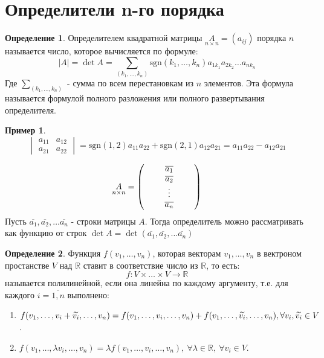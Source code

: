 \documentclass[a4paper, 12pt]{article}
\newcommand{\R}{\mathbb R}
\newcommand\tab[1][.5cm]{\hspace*{#1}}
\theoremstyle{definition}
\newtheorem*{definition}{Определение}
\newtheorem*{example1}{Пример}
\begin{document}
  \section{Определители n-го порядка}
  \begin{definition}
    Определителем квадратной матрицы $\underset{n \times n}{A}=(a_{ij})$ порядка $n$ называется число, которое вычисляется по формуле:
    $$|A|=\det{A}=\sum\limits_{(k_1,\dots,k_n)}\textrm{sgn}(k_1,\dots,k_n)a_{1k_1}a_{2k_2}\dots a_{nk_n}$$
    Где $\sum\limits_{(k_1,\dots,k_n)}$ - сумма по всем перестановкам из $n$ элементов. Эта формула называется формулой полного разложения или полного развертывания определителя.
  \end{definition}
  \begin{example1}
    $$\begin{vmatrix}
      a_{11} & a_{12}\\
      a_{21} & a_{22}  
    \end{vmatrix} = \textrm{sgn}(1,2)a_{11}a_{22}+\textrm{sgn}(2,1)a_{12}a_{21}=a_{11}a_{22}-a_{12}a_{21}$$
  \end{example1}
  $$\underset{n \times n}{A}=\begin{pmatrix}
    \tab & \overline{a_1} & \tab\\
    \null & \overline{a_2} & \null\\
    \null & \vdots & \null\\
    \null & \overline{a_n} & \null
  \end{pmatrix}$$
  Пусть $\overline{a_1}, \overline{a_2}, \dots \overline{a_n}$ - строки матрицы $A$. Тогда определитель можно рассматривать как функцию от строк $\det{A}=\det{(\overline{a_1},\overline{a_2},\dots \overline{a_n})}$
  \begin{definition}
    Функция $f(v_1,\dots, v_n)$, которая векторам $v_1,\dots, v_n$ в вектроном простанстве $V$ над $\R$ ставит в соответствие число из $\R$, то есть: $$f:V\times\dots\times V\to \R$$
    называется полилинейной, если она линейна по каждому аргументу, т.е. для каждого $i=\overline{1,n}$ выполнено:
    \begin{enumerate}
      \item $f(v_1,\dots, v_i+\widetilde{v_i},\dots, v_n)=f(v_1,\dots, v_i,\dots, v_n)+f(v_1,\dots, \widetilde{v_i},\dots, v_n),\\ \forall v_i, \widetilde{v_i}\in V$.
      \item $f(v_1,\dots, \lambda v_i,\dots, v_n)=\lambda f(v_1,\dots, v_i,\dots, v_n),\ \forall \lambda\in \R,\ \forall v_i\in V$.
    \end{enumerate}
  \end{definition}
\end{document}
